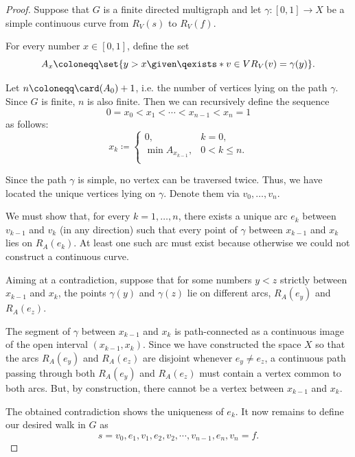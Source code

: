 \begin{proof}
   Suppose that \( G \) is a finite directed multigraph and let \( \gamma: [0, 1] \to X \) be a simple continuous curve from \( R_V(s) \) to \( R_V(f) \).

  For every number \( x \in [0, 1] \), define the set
  \begin{equation*}
    A_x \coloneqq \set{ y > x \given \qexists* {v \in V} R_V(v) = \gamma(y) }.
  \end{equation*}

  Let \( n \coloneqq \card(A_0) + 1 \), i.e. the number of vertices lying on the path \( \gamma \). Since \( G \) is finite, \( n \) is also finite. Then we can recursively define the sequence
  \begin{equation*}
    0 = x_0 < x_1 < \cdots < x_{n-1} < x_n = 1
  \end{equation*}
  as follows:
  \begin{equation*}
    x_k \coloneqq \begin{cases}
      0,                &k = 0, \\
      \min A_{x_{k-1}}, &0 < k \leq n. \\
    \end{cases}
  \end{equation*}

  Since the path \( \gamma \) is simple, no vertex can be traversed twice. Thus, we have located the unique vertices lying on \( \gamma \). Denote them via \( v_0, \ldots, v_n \).

  We must show that, for every \( k = 1, \ldots, n \), there exists a unique arc \( e_k \) between \( v_{k-1} \) and \( v_k \) (in any direction) such that every point of \( \gamma \) between \( x_{k-1} \) and \( x_k \) lies on \( R_A(e_k) \). At least one such arc must exist because otherwise we could not construct a continuous curve.

  Aiming at a contradiction, suppose that for some numbers \( y < z \) strictly between \( x_{k-1} \) and \( x_k \), the points \( \gamma(y) \) and \( \gamma(z) \) lie on different arcs, \( R_A(e_y) \) and \( R_A(e_z) \).

  The segment of \( \gamma \) between \( x_{k-1} \) and \( x_k \) is path-connected as a continuous image of the open interval \( (x_{k-1}, x_k) \). Since we have constructed the space \( X \) so that the arcs \( R_A(e_y) \) and \( R_A(e_z) \) are disjoint whenever \( e_y \neq e_z \), a continuous path passing through both \( R_A(e_y) \) and \( R_A(e_z) \) must contain a vertex common to both arcs. But, by construction, there cannot be a vertex between \( x_{k-1} \) and \( x_k \).

  The obtained contradiction shows the uniqueness of \( e_k \). It now remains to define our desired walk in \( G \) as
  \begin{equation*}
    s = v_0, e_1, v_1, e_2, v_2, \cdots, v_{n-1}, e_n, v_n = f.
  \end{equation*}
\end{proof}

